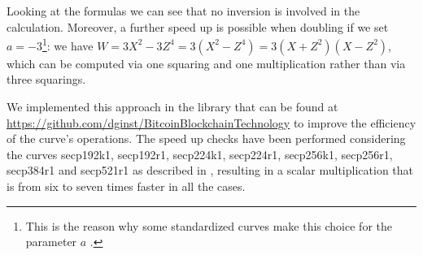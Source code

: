 Looking at the formulas we can see that no inversion is involved in the calculation. Moreover, a further speed up is possible when doubling if we set $a = -3$\footnote{This is the reason why some standardized curves make this choice for the parameter $a$ .}: we have $W = 3X^2 -3Z^4 = 3(X^2 - Z^4) = 3(X + Z^2)(X - Z^2)$, which can be computed via one squaring and one multiplication rather than via three squarings.

\bigskip
\noindent
We implemented this approach in the library that can be found at \url{https://github.com/dginst/BitcoinBlockchainTechnology} to improve the efficiency of the curve's operations. The speed up checks have been performed considering the curves secp192k1, secp192r1, secp224k1, secp224r1, secp256k1, secp256r1, secp384r1 and secp521r1 as described in \cite{RefWork:3}, resulting in a scalar multiplication that is from six to seven times faster in all the cases.

\bigskip

